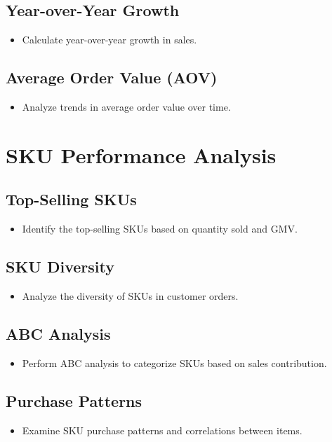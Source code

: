 \documentclass{article}
\begin{document}
    \subsection{Year-over-Year Growth}
    \begin{itemize}
        \item Calculate year-over-year growth in sales.
    \end{itemize}
    
    \subsection{Average Order Value (AOV)}
    \begin{itemize}
        \item Analyze trends in average order value over time.
    \end{itemize}

\section{SKU Performance Analysis}
    \subsection{Top-Selling SKUs}
    \begin{itemize}
        \item Identify the top-selling SKUs based on quantity sold and GMV.
    \end{itemize}
    
    \subsection{SKU Diversity}
    \begin{itemize}
        \item Analyze the diversity of SKUs in customer orders.
    \end{itemize}
    
    \subsection{ABC Analysis}
    \begin{itemize}
        \item Perform ABC analysis to categorize SKUs based on sales contribution.
    \end{itemize}
    
    \subsection{Purchase Patterns}
    \begin{itemize}
        \item Examine SKU purchase patterns and correlations between items.
    \end{itemize}
\end{document}
